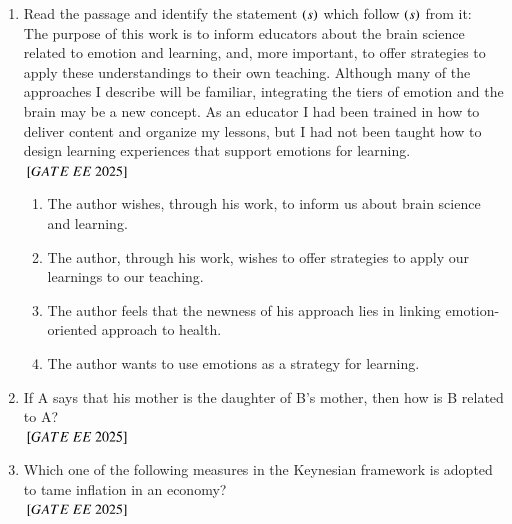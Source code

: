 \documentclass[journal,12pt,onecolumn]{IEEEtran}
\theoremstyle{remark}
\begin{document}
\begin{enumerate}
   \item Read the passage and identify the statement $\left(s\right)$ which follow $\left(s\right)$ from it: \\    
      The purpose of this work is to inform educators about the brain science related to emotion and learning, and, more important, to offer strategies to apply these understandings to their own teaching. Although many of the approaches I describe will be familiar, integrating the tiers of emotion and the brain may be a new concept. As an educator I had been trained in how to deliver content and organize my lessons, but I had not been taught how to design learning experiences that support emotions for learning. \\     
     \hfill ${}\left[GATE\ EE\ 2025\right]$
    \begin{enumerate}
    \item  The author wishes, through his work, to inform us about brain science and learning.    
  \item The author, through his work, wishes to offer strategies to apply our learnings to our teaching.    
  \item The author feels that the newness of his approach lies in linking emotion-oriented approach to health.   
  \item The author wants to use emotions as a strategy for learning.   
   \end{enumerate}

   \item If A says that his mother is the daughter of B's mother, then how is B related to A? \\    
    \hfill ${}\left[GATE\ EE\ 2025\right]$
    \begin{enumerate}
       \end{enumerate}

    \item Which one of the following measures in the Keynesian framework is adopted to tame inflation in an economy? \\
    \hfill ${}\left[GATE\ EE\ 2025\right]$

    \begin{enumerate}
      \end{enumerate}


\end{enumerate}
\end{document}
